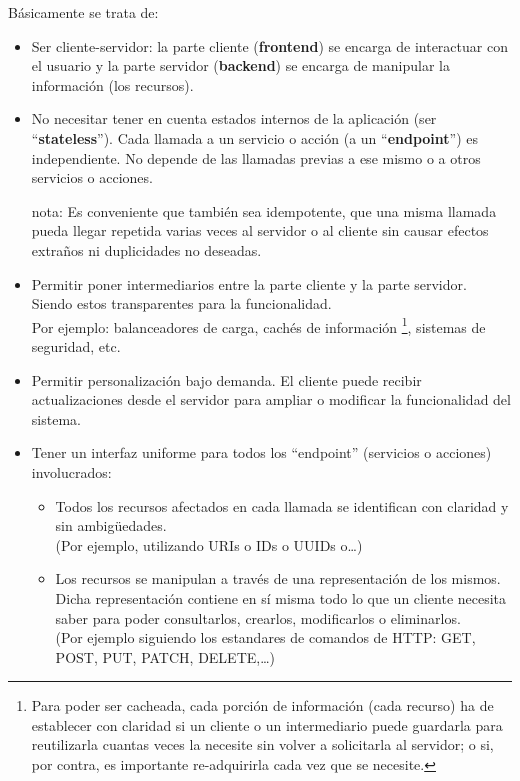 \documentclass[spanish,12pt,a4paper,final,oneside]{book}
\begin{document}
Básicamente se trata de:

\begin{itemize}

\item Ser cliente-servidor: la parte cliente (\textbf{frontend}) se encarga de interactuar con el usuario y la parte servidor (\textbf{backend}) se encarga de manipular la información (los recursos).

\item No necesitar tener en cuenta estados internos de la aplicación (ser ``\textbf{stateless}''). Cada llamada a un servicio o acción (a un ``\textbf{endpoint}'') es independiente. No depende de las llamadas previas a ese mismo o a otros servicios o acciones.

{\footnotesize nota: Es conveniente que también sea idempotente, que una misma llamada  pueda llegar repetida varias veces al servidor o al cliente sin causar efectos extraños ni duplicidades no deseadas.}

\item Permitir poner intermediarios entre la parte cliente y la parte servidor. Siendo estos transparentes para la funcionalidad.
\\{\footnotesize Por ejemplo: balanceadores de carga, cachés de información \footnote{Para poder ser cacheada, cada porción de información (cada recurso) ha de establecer con claridad si un cliente o un intermediario puede guardarla para reutilizarla cuantas veces la necesite sin volver a solicitarla al servidor; o si, por contra, es importante re-adquirirla cada vez que se necesite.}, sistemas de seguridad, etc.}

\item Permitir personalización bajo demanda. El cliente puede recibir actualizaciones desde el servidor para ampliar o modificar la funcionalidad del sistema.

\item Tener un interfaz uniforme para todos los ``endpoint'' (servicios o acciones) involucrados:

\begin{itemize}

\item Todos los recursos afectados en cada llamada se identifican con claridad y sin ambigüedades. 
\\{\footnotesize (Por ejemplo, utilizando URIs o IDs o UUIDs o\ldots)}

\item Los recursos se manipulan a través de una representación de los mismos. Dicha representación contiene en sí misma todo lo que un cliente necesita saber para poder consultarlos, crearlos, modificarlos o eliminarlos.
\\{\footnotesize (Por ejemplo siguiendo los estandares de comandos de HTTP: GET, POST, PUT, PATCH, DELETE,\ldots)}


\end{itemize}
\end{itemize}
\end{document}

